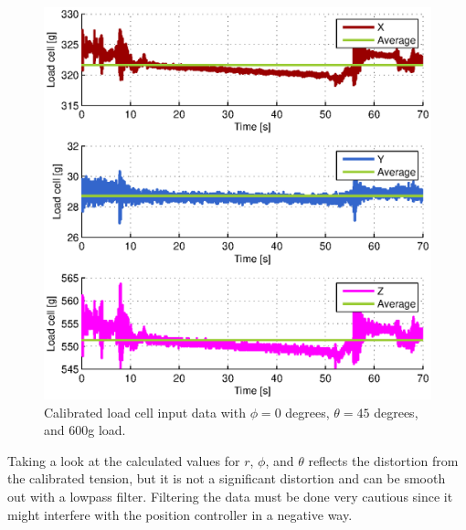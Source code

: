 \begin{figure}[hbtp]
\centering
\includegraphics[scale=1]{graphics/fcs_test/calib_result_compare.eps}
\caption{Calibrated load cell input data with $\phi=0$ degrees, $\theta=45$ degrees, and 600g load.}
\label{fig:FCS-calib-results}
\end{figure}

\noindent
Taking a look at the calculated values for $r$, $\phi$, and $\theta$ reflects the distortion from the calibrated tension, but it is not a significant distortion and can be smooth out with a lowpass filter. Filtering the data must be done very cautious since it might interfere with the position controller in a negative way.  

